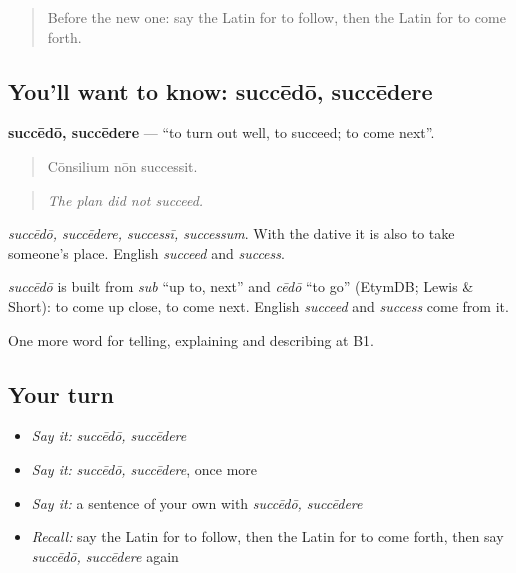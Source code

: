 \label{lesson:LA-C373-succedo}



\begin{quote}
Before the new one: say the Latin for to follow, then the Latin for to come forth.
\end{quote}

\subsection*{You'll want to know: succēdō, succēdere}
\textbf{succēdō, succēdere} — \textquotedblleft{}to turn out well, to succeed; to come next\textquotedblright{}.

\begin{quote}
Cōnsilium nōn successit.
\end{quote}

\begin{quote}
\emph{The plan did not succeed.}
\end{quote}

\emph{succēdō, succēdere, successī, successum}. With the dative it is also to take someone's place. English \emph{succeed} and \emph{success}.

\begin{cousinweb}
\emph{succēdō} is built from \emph{sub} \textquotedblleft{}up to, next\textquotedblright{} and \emph{cēdō} \textquotedblleft{}to go\textquotedblright{} (EtymDB; Lewis \& Short): to come up close, to come next. English \emph{succeed} and \emph{success} come from it.
\end{cousinweb}

\begin{grammarlens}[title={What you've built}]
One more word for telling, explaining and describing at B1.
\end{grammarlens}

\subsection*{Your turn}
\begin{itemize}
\raggedright
  \item \emph{Say it:} \emph{succēdō, succēdere}
  \item \emph{Say it:} \emph{succēdō, succēdere}, once more
  \item \emph{Say it:} a sentence of your own with \emph{succēdō, succēdere}
  \item \emph{Recall:} say the Latin for to follow, then the Latin for to come forth, then say \emph{succēdō, succēdere} again
\end{itemize}

